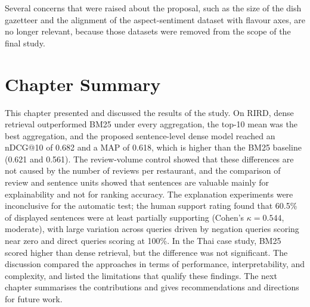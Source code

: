 Several concerns that were raised about the proposal, such as the size of the dish gazetteer and the alignment of the aspect-sentiment dataset with flavour axes, are no longer relevant, because those datasets were removed from the scope of the final study.

\section{Chapter Summary}
\label{sec:chap4summary}

This chapter presented and discussed the results of the study. On RIRD, dense retrieval outperformed BM25 under every aggregation, the top-10 mean was the best aggregation, and the proposed sentence-level dense model reached an nDCG@10 of 0.682 and a MAP of 0.618, which is higher than the BM25 baseline (0.621 and 0.561). The review-volume control showed that these differences are not caused by the number of reviews per restaurant, and the comparison of review and sentence units showed that sentences are valuable mainly for explainability and not for ranking accuracy. The explanation experiments were inconclusive for the automatic test; the human support rating found that 60.5\% of displayed sentences were at least partially supporting (Cohen's $\kappa = 0.544$, moderate), with large variation across queries driven by negation queries scoring near zero and direct queries scoring at 100\%. In the Thai case study, BM25 scored higher than dense retrieval, but the difference was not significant. The discussion compared the approaches in terms of performance, interpretability, and complexity, and listed the limitations that qualify these findings. The next chapter summarises the contributions and gives recommendations and directions for future work.
